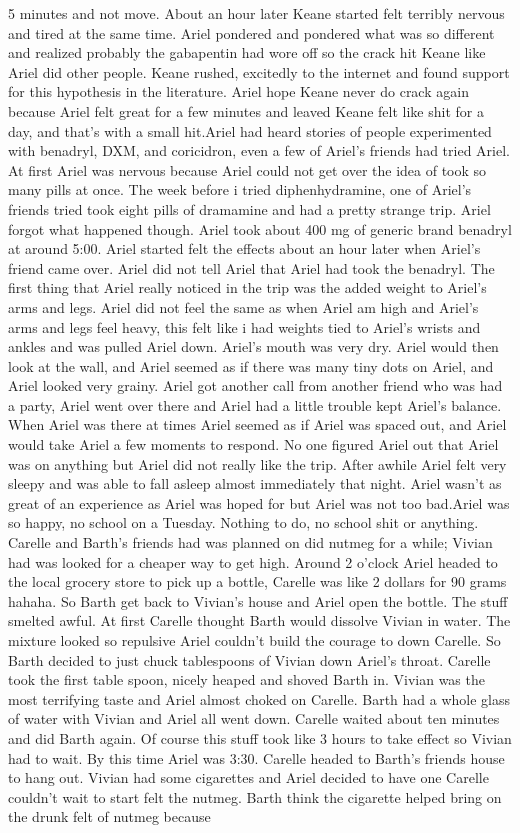 \documentclass[12pt]{book}
\begin{document}
5 minutes and not move. About an hour later Keane started felt terribly nervous and tired at the same time. Ariel pondered and pondered what was so different and realized probably the gabapentin had wore off so the crack hit Keane like Ariel did other people. Keane rushed, excitedly to the internet and found support for this hypothesis in the literature. Ariel hope Keane never do crack again because Ariel felt great for a few minutes and leaved Keane felt like shit for a day, and that's with a small hit.Ariel had heard stories of people experimented with benadryl, DXM, and coricidron, even a few of Ariel's friends had tried Ariel. At first Ariel was nervous because Ariel could not get over the idea of took so many pills at once. The week before i tried diphenhydramine, one of Ariel's friends tried took eight pills of dramamine and had a pretty strange trip. Ariel forgot what happened though. Ariel took about 400 mg of generic brand benadryl at around 5:00. Ariel started felt the effects about an hour later when Ariel's friend came over. Ariel did not tell Ariel that Ariel had took the benadryl. The first thing that Ariel really noticed in the trip was the added weight to Ariel's arms and legs. Ariel did not feel the same as when Ariel am high and Ariel's arms and legs feel heavy, this felt like i had weights tied to Ariel's wrists and ankles and was pulled Ariel down. Ariel's mouth was very dry. Ariel would then look at the wall, and Ariel seemed as if there was many tiny dots on Ariel, and Ariel looked very grainy. Ariel got another call from another friend who was had a party, Ariel went over there and Ariel had a little trouble kept Ariel's balance. When Ariel was there at times Ariel seemed as if Ariel was spaced out, and Ariel would take Ariel a few moments to respond. No one figured Ariel out that Ariel was on anything but Ariel did not really like the trip. After awhile Ariel felt very sleepy and was able to fall asleep almost immediately that night. Ariel wasn't as great of an experience as Ariel was hoped for but Ariel was not too bad.Ariel was so happy, no school on a Tuesday. Nothing to do, no school shit or anything. Carelle and Barth's friends had was planned on did nutmeg for a while; Vivian had was looked for a cheaper way to get high. Around 2 o'clock Ariel headed to the local grocery store to pick up a bottle, Carelle was like 2 dollars for 90 grams hahaha. So Barth get back to Vivian's house and Ariel open the bottle. The stuff smelted awful. At first Carelle thought Barth would dissolve Vivian in water. The mixture looked so repulsive Ariel couldn't build the courage to down Carelle. So Barth decided to just chuck tablespoons of Vivian down Ariel's throat. Carelle took the first table spoon, nicely heaped and shoved Barth in. Vivian was the most terrifying taste and Ariel almost choked on Carelle. Barth had a whole glass of water with Vivian and Ariel all went down. Carelle waited about ten minutes and did Barth again. Of course this stuff took like 3 hours to take effect so Vivian had to wait. By this time Ariel was 3:30. Carelle headed to Barth's friends house to hang out. Vivian had some cigarettes and Ariel decided to have one Carelle couldn't wait to start felt the nutmeg. Barth think the cigarette helped bring on the drunk felt of nutmeg because 
\end{document}
